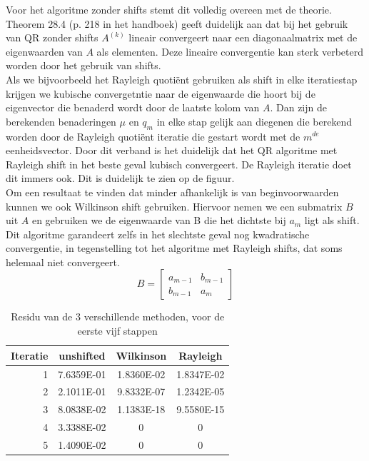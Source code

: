 \documentclass[a4paper, 12pt, titlepage]{report}
\begin{document}
Voor het algoritme zonder shifts stemt dit volledig overeen met de theorie. Theorem 28.4 (p. 218 in het handboek) geeft duidelijk aan dat bij het gebruik van QR zonder shifts $A^{(k)}$ lineair convergeert naar een diagonaalmatrix met de eigenwaarden van $A$ als elementen. Deze lineaire convergentie kan sterk verbeterd worden door het gebruik van shifts. \\
Als we bijvoorbeeld het Rayleigh quoti\"ent gebruiken als shift in elke iteratiestap krijgen we kubische convergetntie naar de eigenwaarde die hoort bij de eigenvector die benaderd wordt door de laatste kolom van $A$. Dan zijn de berekenden benaderingen $\mu$ en $q_m$ in elke stap gelijk aan diegenen die berekend worden door de Rayleigh quoti\"ent iteratie die gestart wordt met de $m^{de}$ eenheidsvector. Door dit verband is het duidelijk dat het QR algoritme met Rayleigh shift in het beste geval kubisch convergeert. De Rayleigh iteratie doet dit immers ook. Dit is duidelijk te zien op de figuur. \\
Om een resultaat te vinden dat minder afhankelijk is van beginvoorwaarden kunnen we ook Wilkinson shift gebruiken. Hiervoor nemen we een submatrix $B$ uit $A$ en gebruiken we de eigenwaarde van B die het dichtste bij $a_m$ ligt als shift. Dit algoritme garandeert zelfs in het slechtste geval nog kwadratische convergentie, in tegenstelling tot het algoritme met Rayleigh shifts, dat soms helemaal niet convergeert.
\begin{equation}
 B=\begin{bmatrix} a_{m-1} & b_{m-1} \\ b_{m-1} & a_m\end{bmatrix}
\end{equation}


\begin{table}[h]
\begin{center}
\begin{tabular}{r||c|c|c}

Iteratie	&	\textbf{unshifted}	&	\textbf{Wilkinson}	&	\textbf{Rayleigh}	\\
\hline
1	&	7.6359E-01	&	1.8360E-02	&	1.8347E-02	\\
2	&	2.1011E-01	&	9.8332E-07	&	1.2342E-05	\\
3	&	8.0838E-02	&	1.1383E-18	&	9.5580E-15	\\
4	&	3.3388E-02	&	0		&		0	\\
5	&	1.4090E-02	&	0		&		0	\\

\end{tabular}
\caption{Residu van de 3 verschillende methoden, voor de eerste vijf stappen}
\label{errorQR}

\end{center}
\end{table}
\end{document}
